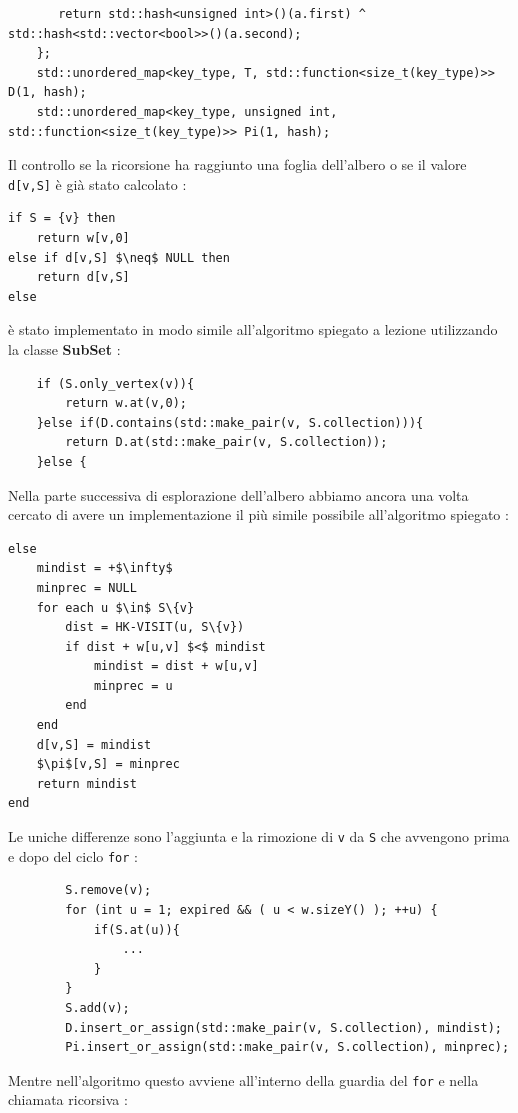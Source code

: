 \documentclass[]{article}
\begin{document}
\begin{flushleft}
\begin{lstlisting}
       return std::hash<unsigned int>()(a.first) ^ std::hash<std::vector<bool>>()(a.second);
    };
    std::unordered_map<key_type, T, std::function<size_t(key_type)>> D(1, hash);
    std::unordered_map<key_type, unsigned int, std::function<size_t(key_type)>> Pi(1, hash);
\end{lstlisting}
\medskip
Il controllo se la ricorsione ha raggiunto una foglia dell'albero o se il valore \verb|d[v,S]| è già stato calcolato :
\begin{lstlisting}[mathescape=true]
if S = {v} then
	return w[v,0]
else if d[v,S] $\neq$ NULL then
	return d[v,S]
else
\end{lstlisting}
è stato implementato in modo simile all'algoritmo spiegato a lezione utilizzando la classe \textbf{SubSet} :
\lstset{language=c++, style=mystyle, firstnumber=6}
\begin{lstlisting}
	if (S.only_vertex(v)){
        return w.at(v,0);
    }else if(D.contains(std::make_pair(v, S.collection))){
        return D.at(std::make_pair(v, S.collection));
    }else {
\end{lstlisting}
\medskip
Nella parte successiva di esplorazione dell'albero abbiamo ancora una volta cercato di avere un implementazione il più simile possibile all'algoritmo spiegato :
\begin{lstlisting}[mathescape=true]
else
	mindist = +$\infty$
	minprec = NULL
	for each u $\in$ S\{v}
		dist = HK-VISIT(u, S\{v})
		if dist + w[u,v] $<$ mindist
			mindist = dist + w[u,v]
			minprec = u
		end
	end
	d[v,S] = mindist
	$\pi$[v,S] = minprec
	return mindist
end
\end{lstlisting}
Le uniche differenze sono l'aggiunta e la rimozione di \verb|v| da \verb|S| che avvengono prima e dopo del ciclo \verb|for| :
\lstset{language=c++, style=mystyle, firstnumber=26}
\begin{lstlisting}
        S.remove(v);
        for (int u = 1; expired && ( u < w.sizeY() ); ++u) {
        	if(S.at(u)){
            	...
            }
        }
        S.add(v);
        D.insert_or_assign(std::make_pair(v, S.collection), mindist);
        Pi.insert_or_assign(std::make_pair(v, S.collection), minprec);
\end{lstlisting}
Mentre nell'algoritmo questo avviene all'interno della guardia del \verb|for| e nella chiamata ricorsiva :

\end{flushleft}
\end{document}

